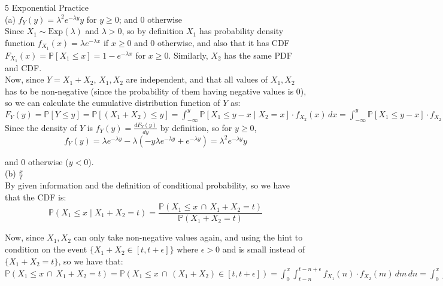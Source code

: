 \documentclass{article}
\begin{document}
{\Large 5 Exponential Practice} \\[.5cm]
{\color{red} (a) $f_Y(y) = \lambda^2 e^{-\lambda y} y$ for $y\geq 0$; and 0 otherwise} \\

Since $X_1\sim\text{Exp}(\lambda)$ and $\lambda > 0$, so by definition $X_1$ has probability density function $f_{X_1}(x) = \lambda e^{-\lambda x}$ if $x\geq0$ and 0 otherwise, and also that
it has CDF $F_{X_1}(x) = \mathbb{P}[X_1\leq x] = 1 - e^{-\lambda x}$ for $x\geq0$.
Similarly, $X_2$ has the same PDF and CDF. \\

Now, since $Y = X_1 + X_2$, $X_1, X_2$ are independent, and that all values of $X_1, X_2$ has to be non-negative (since the probability of them having negative values is 0), so we can calculate the cumulative distribution function of $Y$ as:
$
F_Y(y) = \mathbb{P}[Y\leq y] =
\mathbb{P}[(X_1+X_2)\leq y] =
\int_{-\infty}^y
	\mathbb{P}[X_1\leq y-x\mid X_2=x] \cdot f_{X_2}(x) \, dx =
\int_{-\infty}^y
	\mathbb{P}[X_1\leq y-x] \cdot f_{X_2}(x) \, dx =
\int_{-\infty}^y
	(1-e^{-\lambda(y-x)}) \cdot \lambda e^{-\lambda x} \, dx =
\int_{-\infty}^y \lambda e^{-\lambda x} \, dx -
	\int_{-\infty}^y \lambda e^{\lambda x-\lambda y -\lambda x} \, dx =
\int_{0}^y \lambda e^{-\lambda x} \, dx -
	\int_{0}^y \lambda e^{-\lambda y} \, dx =
-e^{-\lambda x}\Big|_0^y - (\lambda e^{-\lambda y}x)\Big|_0^y =
1 - e^{-\lambda y} - \lambda e^{-\lambda y}y
$ \\

Since the density of $Y$ is
$f_Y(y) = \frac{dF_Y(y)}{dy}$ by definition,
so for $y\geq 0$,
$$f_Y(y) =
\lambda e^{-\lambda y} - \lambda (-y\lambda e^{-\lambda y} + e^{-\lambda y}) =
\lambda^2 e^{-\lambda y} y
$$

and 0 otherwise ($y < 0$). \\[1cm]
{\color{red} (b) $\frac{x}{t}$} \\

By given information and the definition of conditional probability, so we have that the CDF is:
$$\mathbb{P}(X_1\leq x\mid X_1 + X_2 = t) =
\frac{\mathbb{P}(X_1\leq x\, \cap\, X_1 + X_2 = t)}{\mathbb{P}(X_1 + X_2 = t)}
$$

Now, since $X_1, X_2$ can only take non-negative values again, and using the hint to condition on the event
$\{X_1 + X_2 \in [t, t+\epsilon]\}$ where $\epsilon>0$ and is small instead of
$\{X_1 + X_2 = t\}$,
so we have that:
$\mathbb{P}(X_1\leq x\, \cap\, X_1 + X_2 = t) =
\mathbb{P}(X_1\leq x\, \cap\, (X_1 + X_2) \in [t, t+\epsilon]) =
\int_0^x \int_{t-n}^{t-n+\epsilon}
	f_{X_1}(n) \cdot f_{X_2}(m) \,dm \,dn =
\int_0^x \int_{t-n}^{t-n+\epsilon}
	(\lambda e^{-\lambda n}) \cdot (\lambda e^{-\lambda m}) \,dm\,dn =
\int_0^x \lambda e^{-\lambda n} \Big(-e^{-\lambda m}\Big|_{t-n}^{t-n+\epsilon}\Big) \,dn =
\int_0^x \lambda e^{-\lambda t} (1-e^{\lambda\epsilon}) \,dn =
\lambda e^{-\lambda t}(1-e^{-\lambda\epsilon})x$ \\
\end{document}
